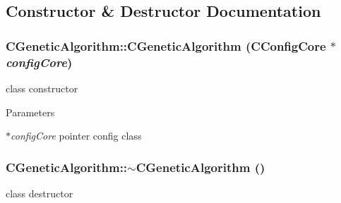 \subsection{Constructor \& Destructor Documentation}
\hypertarget{classCGeneticAlgorithm_a08e490f073f3f053004347361436a192}{
\subsubsection[{CGeneticAlgorithm}]{\setlength{\rightskip}{0pt plus 5cm}CGeneticAlgorithm::CGeneticAlgorithm ({\bf CConfigCore} $\ast$ {\em configCore})}}
\label{classCGeneticAlgorithm_a08e490f073f3f053004347361436a192}
class constructor


\begin{DoxyParams}{Parameters}
\item[{\em $\ast$configCore}]pointer config class \end{DoxyParams}
\hypertarget{classCGeneticAlgorithm_a6d5d96bde33bb3b14795f100b01e08a9}{
\subsubsection[{$\sim$CGeneticAlgorithm}]{\setlength{\rightskip}{0pt plus 5cm}CGeneticAlgorithm::$\sim$CGeneticAlgorithm ()}}
\label{classCGeneticAlgorithm_a6d5d96bde33bb3b14795f100b01e08a9}
class destructor 

